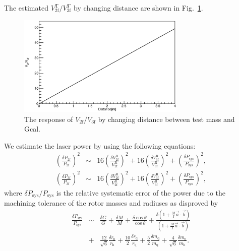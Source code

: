 \documentclass[%
 reprint,
superscriptaddress,
 amsmath,amssymb,
 aps,
]{revtex4-1}
\begin{document}
\normalsize
The estimated $V^{\mathrm{T}}_{\mathrm{2f}}/V^{T}_{\mathrm{3f}}$ by changing distance are shown in Fig.~\ref{fig:dvsVV}.
\begin{figure}
\begin{center}
\includegraphics[width=8cm]{dvsVV.eps}
\caption{The response of $V_{\mathrm{2f}}/V_{\mathrm{3f}}$ by changing distance between test mass and Gcal.}
\label{fig:dvsVV}
\end{center}
\end{figure}
We  estimate the laser power by using the following equations:
\footnotesize
\begin{eqnarray}
\left( \frac{\delta P_{\mathrm{2f}}}{P_{\mathrm{2f}}} \right)^2 &\sim&  \!16 \! \left( \frac{\delta V^{\mathrm{R}}_{{\mathrm{2f}}}}{V^{\mathrm{R}}_{{\mathrm{2f}}}} \!\right)^2+16\left( \frac{\delta V^{\mathrm{R}}_{{\mathrm{3f}}}}{V^{\mathrm{R}}_{{\mathrm{3f}}}} \right)^2 +\left( \frac{\delta P_{\mathrm{sys}}}{P_{\mathrm{sys}}} \right)^2, \label{dP2f} \\ 
\left( \frac{\delta P_{\mathrm{3f}}}{P_{\mathrm{3f}}} \right)^2 &\sim&  \!16 \! \left( \frac{\delta V^{\mathrm{R}}_{{\mathrm{2f}}}}{V^{\mathrm{R}}_{{\mathrm{2f}}}} \right)^2+16\left( \frac{\delta V^{\mathrm{R}}_{{\mathrm{3f}}}}{V^{\mathrm{R}}_{{\mathrm{3f}}}} \right)^2+\left( \frac{\delta P_{\mathrm{sys}}}{P_{\mathrm{sys}}} \right)^2,  \label{dP3f}
\end{eqnarray}
\normalsize
where $\delta P_{\mathrm{sys}}/P_{\mathrm{sys}}$ is the relative systematic error  of the power due to the machining tolerance of the rotor masses and radiuses as disproved by
\begin{eqnarray}
\frac{\delta P_{\mathrm{sys}}}{P_{\mathrm{sys}}}&\sim& \frac{\delta G}{G} + \frac{\delta M}{M} +\frac{\delta \cos{\theta}}{\cos{\theta}}+ \frac{\delta\left( 1+\frac{M}{I}\vec{a}\cdot \vec{b} \right)}{\! \left( \! 1+\frac{M}{I}\vec{a}\cdot \vec{b} \! \right)}  \nonumber \\
&+&\frac{12}{\sqrt{6}} \frac{\delta r_{\mathrm{h}}}{r_{\mathrm{h}}} +\frac{10}{2} \frac{\delta r_{\mathrm{q}}}{r_{\mathrm{q}}}  +\frac{5}{2} \frac{\delta m_{\mathrm{q}}}{m_{\mathrm{q}}} +\!\frac{4}{\sqrt{6}}  \! \frac{\delta m_{\mathrm{h}}}{m_{\mathrm{h}}}.
\end{eqnarray}
\end{document}
